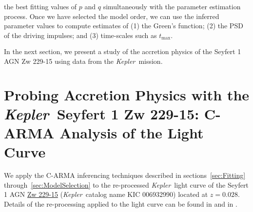 \documentclass[a4paper,fleqn,usenatbib]{mnras}
\newcommand{\Kepler}{\textit{Kepler~}}
\begin{document}
the best fitting values of $p$ and $q$ simultaneously with the parameter estimation process. Once we have selected the model order, we can use the inferred parameter values to compute estimates of (1) the Green's function; (2) the PSD of the driving impulses; and (3) time-scales such as $t_\mathrm{max}$.

In the next section, we present a study of the accretion physics of the Seyfert 1 AGN Zw 229-15 using data from the \Kepler mission.

\section[C-ARMA Analysis of Zw 229-15]{Probing Accretion Physics with the \Kepler Seyfert 1 Zw 229-15: C-ARMA Analysis of the Light Curve}\label{sec:Zw229-15}

We apply the C-ARMA inferencing techniques described in sections~\ref{sec:Fitting} through~\ref{sec:ModelSelection} to the re-processed \Kepler light curve of the Seyfert 1 AGN \href{http://ned.ipac.caltech.edu/cgi-bin/objsearch?objname=Zw+229-15&extend=no&hconst=73&omegam=0.27&omegav=0.73&corr_z=1&out_csys=Equatorial&out_equinox=J2000.0&obj_sort=RA+or+Longitude&of=pre_text&zv_breaker=30000.0&list_limit=5&img_stamp=YES}{Zw 229-15} (\Kepler catalog name KIC 006932990) located at $z = 0.028$. Details of the re-processing applied to the light curve can be found in \citep{CariniWilliamsAAS} and in \citet{Kasliwal15b}.



\end{document}
